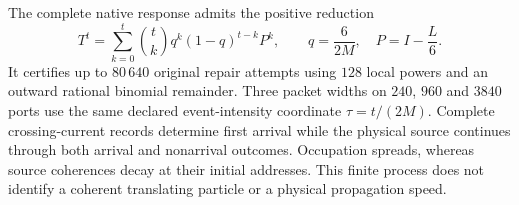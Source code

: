 The complete native response admits the positive reduction
\[
 T^t=\sum_{k=0}^{t}\binom tk q^k(1-q)^{t-k}P^k,
 \qquad q=\frac6{2M},\quad P=I-\frac L6.
\]
It certifies up to $80\,640$ original repair attempts using $128$ local
powers and an outward rational binomial remainder. Three packet widths
on $240$, $960$ and $3840$ ports use the same declared event-intensity
coordinate $\tau=t/(2M)$. Complete crossing-current records determine
first arrival while the physical source continues through both arrival
and nonarrival outcomes. Occupation spreads, whereas source coherences
decay at their initial addresses. This finite process does not identify
a coherent translating particle or a physical propagation speed.
